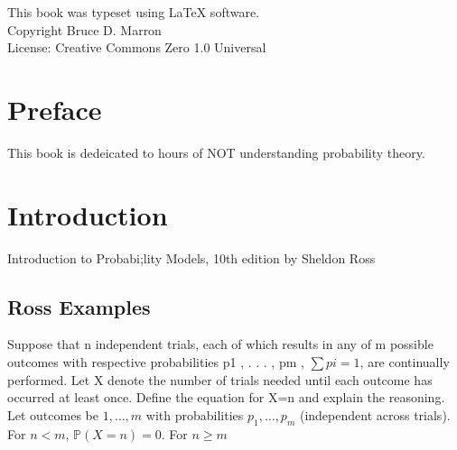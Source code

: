 \documentclass{book}
\newcommand{\bookauthor}{Bruce D. Marron}
\newcommand{\booklicense}{Creative Commons Zero 1.0 Universal}
\begin{document}
\thispagestyle{empty}

\begin{flushleft}
\vspace*{\fill}   %

This book was typeset using \LaTeX{} software.\\
Copyright \textcopyright{} \the\year{}  \bookauthor\\
License: \booklicense
\end{flushleft}

\addtocounter{page}{2}

\chapter*{Preface}
This book is dedeicated to hours of NOT understanding probability theory.


\setcounter{tocdepth}{3}
\tableofcontents

\mainmatter



\chapter{Introduction}
Introduction to Probabi;lity Models, 10th edition by Sheldon Ross



\section{Ross Examples}

Suppose that n independent trials, each of which results in any of m possible outcomes with respective probabilities p1 , . . . , pm , $\sum pi = 1$, are continually performed. Let X denote the number of trials needed until each outcome has occurred at least once. Define the equation for X=n and explain the reasoning.\\


Let outcomes be $1,\dots,m$ with probabilities $p_1,\dots,p_m$ (independent across trials). For $n<m$, $\mathbb{P}(X=n)=0$. For $n\ge m$\\
\end{document}
